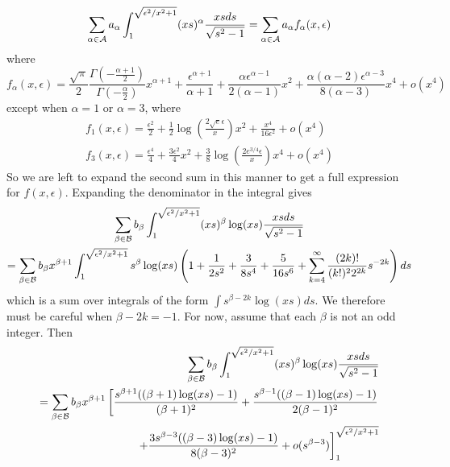 \documentclass{article}
\begin{document}
\begin{equation}
    \sum_{\alpha \in \mathcal{A}}a_{\alpha}\int_1^{\sqrt{\epsilon^2/x^2+1}} (xs)^{\alpha}\frac{xs \space ds}{\sqrt{s^2-1}} = \sum_{\alpha \in \mathcal{A}} a_{\alpha}f_{\alpha}(x,\epsilon)
\end{equation}
where 
\begin{equation}
    f_{\alpha}(x,\epsilon) = \frac{\sqrt{\pi}}{2}\frac{\Gamma(-\frac{\alpha+1}{2})}{\Gamma(-\frac{\alpha}{2})}x^{\alpha+1} + \frac{\epsilon^{\alpha+1}}{\alpha+1} + \frac{\alpha \epsilon^{\alpha-1}}{2(\alpha-1)}x^2 + \frac{\alpha(\alpha-2)\epsilon^{\alpha-3}}{8(\alpha-3)}x^4 + o(x^4)
\end{equation}
except when $\alpha =1$ or $\alpha =3$, where
\begin{align}
    f_1(x,\epsilon) = \frac{\epsilon^2}{2} + \frac{1}{2}\log\left(\frac{2\sqrt{e}\epsilon}{x}\right)x^2 + \frac{x^4}{16\epsilon^2} + o(x^4) \nonumber \\
    f_3(x,\epsilon) = \frac{\epsilon^4}{4} + \frac{3\epsilon^2}{4}x^2 + \frac{3}{8}\log\left(\frac{2e^{3/4}\epsilon}{x}\right)x^4 + o(x^4)
\end{align}
So we are left to expand the second sum in this manner to get a full expression for $f(x,\epsilon)$. Expanding the denominator in the integral gives
\begin{gather}
    \sum_{\beta \in \mathcal{B}}b_{\beta}\int_1^{\sqrt{\epsilon^2/x^2+1}} (xs)^{\beta} \log(xs) \frac{xs \space ds}{\sqrt{s^2-1}} \nonumber \\ = \sum_{\beta \in \mathcal{B}}b_{\beta}x^{\beta+1}\int_1^{\sqrt{\epsilon^2/x^2+1}} s^{\beta} \log(xs) \left(1+\frac{1}{2s^2} + \frac{3}{8s^4} + \frac{5}{16s^6} + \sum_{k=4}^\infty \frac{(2k)!}{(k!)^22^{2k}}s^{-2k}\right)ds
\end{gather}
which is a sum over integrals of the form $\int s^{\beta-2k}\log(xs)ds$. We therefore must be careful when $\beta-2k = -1$. For now, assume that each $\beta$ is not an odd integer. Then
\begin{align}
    \label{eq:integral_of_Taylor}
    \sum_{\beta \in \mathcal{B}}b_{\beta}\int_1^{\sqrt{\epsilon^2/x^2+1}} (xs)^{\beta} \log(xs) \frac{xs \space ds}{\sqrt{s^2-1}} \nonumber \\ = \sum_{\beta \in \mathcal{B}}b_{\beta}x^{\beta+1}\left[\frac{s^{\beta+1}((\beta+1)\log(xs) - 1)}{(\beta+1)^2} + \frac{s^{\beta-1}((\beta-1)\log(xs) - 1)}{2(\beta-1)^2} \right. \nonumber \\ \left. +\frac{3s^{\beta-3}((\beta-3)\log(xs) - 1)}{8(\beta-3)^2} + o(s^{\beta-3})\right]_{1}^{\sqrt{\epsilon^2/x^2+1}}
\end{align}
\end{document}

